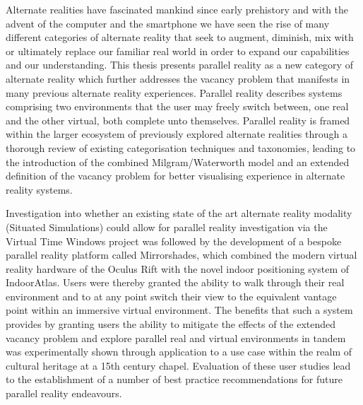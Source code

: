 Alternate realities have fascinated mankind since early prehistory and with the advent of the computer and the smartphone we have seen the rise of many different categories of alternate reality that seek to augment, diminish, mix with or ultimately replace our familiar real world in order to expand our capabilities and our understanding. This thesis presents parallel reality as a new category of alternate reality which further addresses the vacancy problem that manifests in many previous alternate reality experiences. Parallel reality describes systems comprising two environments that the user may freely switch between, one real and the other virtual, both complete unto themselves. Parallel reality is framed within the larger ecosystem of previously explored alternate realities through a thorough review of existing categorisation techniques and taxonomies, leading to the introduction of the combined Milgram/Waterworth model and an extended definition of the vacancy problem for better visualising experience in alternate reality systems.

Investigation into whether an existing state of the art alternate reality modality (Situated Simulations) could allow for parallel reality investigation via the Virtual Time Windows project was followed by the development of a bespoke parallel reality platform called Mirrorshades, which combined the modern virtual reality hardware of the Oculus Rift with the novel indoor positioning system of IndoorAtlas. Users were thereby granted the ability to walk through their real environment and to at any point switch their view to the equivalent vantage point within an immersive virtual environment. The benefits that such a system provides by granting users the ability to mitigate the effects of the extended vacancy problem and explore parallel real and virtual environments in tandem was experimentally shown through application to a use case within the realm of cultural heritage at a 15th century chapel. Evaluation of these user studies lead to the establishment of a number of best practice recommendations for future parallel reality endeavours.